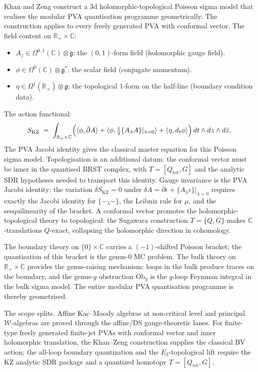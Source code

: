 \documentclass[11pt,reqno]{amsart}
\theoremstyle{definition}
\theoremstyle{remark}
\providecommand{\cW}{\mathcal{W}}
\providecommand{\fg}{\mathfrak{g}}
\providecommand{\bC}{\mathbb{C}}
\providecommand{\bR}{\mathbb{R}}
\providecommand{\KZ}{\mathrm{KZ}}
\providecommand{\Ob}{\mathrm{Ob}}
\numberwithin{equation}{section}
\begin{document}
Khan and Zeng construct a 3d holomorphic-topological Poisson
sigma model that realises the modular PVA quantisation programme
geometrically. The construction applies to every freely generated
PVA with conformal vector. The field content on
$\bR_+ \times \bC$:
\begin{itemize}[nosep]
\item $A_{\bar z} \in \Omega^{0,1}(\bC) \otimes \fg$: the
$(0,1)$-form field (holomorphic gauge field).
\item $\phi \in \Omega^0(\bC) \otimes \fg^*$: the scalar field
(conjugate momentum).
\item $\eta \in \Omega^1(\bR_+) \otimes \fg$: the topological
$1$-form on the half-line (boundary condition data).
\end{itemize}
The action functional:
\[
S_{\KZ}
\;=\;
\int_{\bR_+ \times \bC}
\Bigl(
\langle\phi, \bar\partial A\rangle
+ \langle\phi, \tfrac{1}{2}\{A_\lambda A\}|_{\lambda=0}\rangle
+ \langle\eta, d_t \phi\rangle
\Bigr)
\,dt \wedge dz \wedge d\bar z.
\]
The PVA Jacobi identity gives the classical master equation for this
Poisson sigma model. Topologisation is an additional datum: the
conformal vector must be inner in the quantised BRST complex, with
$T=[Q_{\mathrm{tot}},G]$ and the analytic SDR hypotheses needed to
transport this identity.
Gauge invariance is the PVA Jacobi identity: the variation
$\delta S_{\KZ} = 0$ under
$\delta A = \bar\partial\epsilon + \{A_\lambda \epsilon\}|_{\lambda=0}$
requires exactly the Jacobi identity for
$\{-_\lambda -\}$, the Leibniz rule for $\mu$, and the
sesquilinearity of the bracket. A conformal vector promotes the
holomorphic-topological theory to topological: the Sugawara
construction $T = \{Q, G\}$ makes $\bC$-translations $Q$-exact,
collapsing the holomorphic direction in cohomology.

The boundary theory on $\{0\} \times \bC$ carries a
$(-1)$-shifted Poisson bracket; the quantisation of this bracket
is the genus-$0$ MC problem. The bulk theory on
$\bR_+ \times \bC$ provides the genus-raising mechanism: loops
in the bulk produce traces on the boundary, and the genus-$g$
obstruction $\Ob_g$ is the $g$-loop Feynman integral in the
bulk sigma model. The entire modular PVA quantisation programme
is thereby geometrised.

The scope splits. Affine Kac--Moody algebras at non-critical level and
principal $\cW$-algebras are proved through the affine/DS
gauge-theoretic lanes. For finite-type freely generated finite-jet
PVAs with conformal vector and inner holomorphic translation, the
Khan--Zeng construction supplies the classical BV action; the all-loop
boundary quantization and the $E_3$-topological lift require the KZ
analytic SDR package and a quantized homotopy
$T=[Q_{\mathrm{tot}},G]$.
\end{document}
